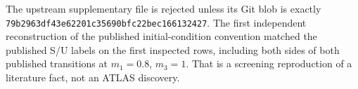 The upstream supplementary file is rejected unless its Git blob is exactly
{\scriptsize\texttt{79b2963df43e62201c35690bfc22bec166132427}}.
The first independent reconstruction of the published initial-condition
convention matched the published S/U labels on the first inspected rows,
including both sides of both published transitions at $m_1=0.8$, $m_3=1$.
That is a screening reproduction of a literature fact, not an ATLAS discovery.
